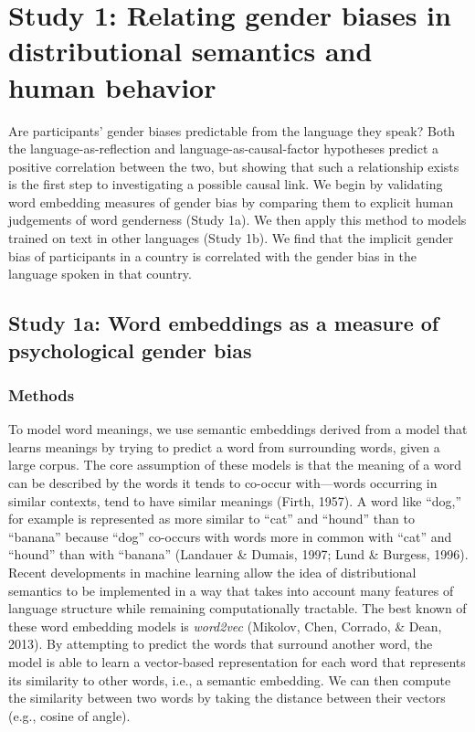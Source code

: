 \documentclass[man,floatsintext]{apa6}
\begin{document}
\hypertarget{study-1-relating-gender-biases-in-distributional-semantics-and-human-behavior}{%
\section{Study 1: Relating gender biases in distributional semantics and human behavior}\label{study-1-relating-gender-biases-in-distributional-semantics-and-human-behavior}}

Are participants' gender biases predictable from the language they speak? Both the language-as-reflection and language-as-causal-factor hypotheses predict a positive correlation between the two, but showing that such a relationship exists is the first step to investigating a possible causal link. We begin by validating word embedding measures of gender bias by comparing them to explicit human judgements of word genderness (Study 1a). We then apply this method to models trained on text in other languages (Study 1b). We find that the implicit gender bias of participants in a country is correlated with the gender bias in the language spoken in that country.

\hypertarget{study-1a-word-embeddings-as-a-measure-of-psychological-gender-bias}{%
\subsection{Study 1a: Word embeddings as a measure of psychological gender bias}\label{study-1a-word-embeddings-as-a-measure-of-psychological-gender-bias}}

\hypertarget{methods}{%
\subsubsection{Methods}\label{methods}}

To model word meanings, we use semantic embeddings derived from a model that learns meanings by trying to predict a word from surrounding words, given a large corpus. The core assumption of these models is that the meaning of a word can be described by the words it tends to co-occur with---words occurring in similar contexts, tend to have similar meanings (Firth, 1957). A word like \enquote{dog,} for example is represented as more similar to \enquote{cat} and \enquote{hound} than to \enquote{banana} because \enquote{dog} co-occurs with words more in common with \enquote{cat} and \enquote{hound} than with \enquote{banana} (Landauer \& Dumais, 1997; Lund \& Burgess, 1996). Recent developments in machine learning allow the idea of distributional semantics to be implemented in a way that takes into account many features of language structure while remaining computationally tractable. The best known of these word embedding models is \emph{word2vec} (Mikolov, Chen, Corrado, \& Dean, 2013). By attempting to predict the words that surround another word, the model is able to learn a vector-based representation for each word that represents its similarity to other words, i.e., a semantic embedding. We can then compute the similarity between two words by taking the distance between their vectors (e.g., cosine of angle).
\end{document}
